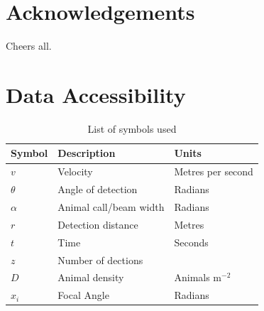 \documentclass[a4paper,10pt,reqno,oneside]{amsart}
\begin{document}
\section{Acknowledgements}
Cheers all.


\section{Data Accessibility}






\begin{table}[t]
\centering
\begin{tabular}{lll}
Symbol 	& Description & Units\\\hline
$v$		& Velocity & Metres per second\\
$\theta$	& Angle of detection & Radians \\
$\alpha$	& Animal call/beam width & Radians \\
$r$ 		& Detection distance & Metres\\
$t$			& Time & Seconds\\
$z$			& Number of dections & \\
$D$		& Animal density & Animals m$^{-2}$ \\
$x_i$	& Focal Angle 	& Radians\\
\end{tabular}
\caption{List of symbols used}
\label{t:paras}
\end{table}



	
	
\end{document}
